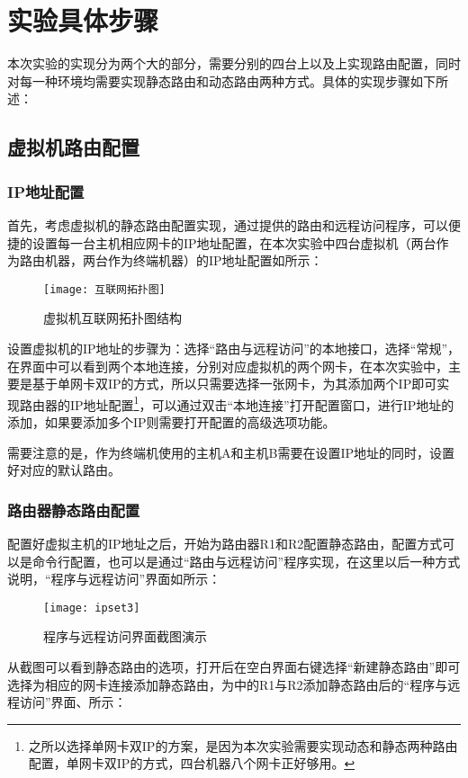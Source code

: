 \documentclass[lang=cn,11pt]{elegantpaper}
\begin{document}
\section{实验具体步骤}
本次实验的实现分为两个大的部分，需要分别的四台上以及上实现路由配置，同时对每一种环境均需要实现静态路由和动态路由两种方式。具体的实现步骤如下所述：
\subsection{虚拟机路由配置}
\subsubsection{IP地址配置}
首先，考虑虚拟机的静态路由配置实现，通过提供的路由和远程访问程序，可以便捷的设置每一台主机相应网卡的IP地址配置，在本次实验中四台虚拟机（两台作为路由机器，两台作为终端机器）的IP地址配置如所示：
\begin{figure}[htbp]
	\centering
	\texttt{[image: 互联网拓扑图]}
	\caption{虚拟机互联网拓扑图结构 \label{fig:tuopu}}
\end{figure}
设置虚拟机的IP地址的步骤为：选择“路由与远程访问”的本地接口，选择“常规”，在界面中可以看到两个本地连接，分别对应虚拟机的两个网卡，在本次实验中，主要是基于单网卡双IP的方式，所以只需要选择一张网卡，为其添加两个IP即可实现路由器的IP地址配置\footnote{之所以选择单网卡双IP的方案，是因为本次实验需要实现动态和静态两种路由配置，单网卡双IP的方式，四台机器八个网卡正好够用。}，可以通过双击“本地连接”打开配置窗口，进行IP地址的添加，如果要添加多个IP则需要打开配置的高级选项功能。

需要注意的是，作为终端机使用的主机A和主机B需要在设置IP地址的同时，设置好对应的默认路由。
\subsubsection{路由器静态路由配置}
配置好虚拟主机的IP地址之后，开始为路由器R1和R2配置静态路由，配置方式可以是命令行配置，也可以是通过“路由与远程访问”程序实现，在这里以后一种方式说明，“程序与远程访问”界面如所示：
\begin{figure}[htbp]
	\centering
	\texttt{[image: ipset3]}
	\caption{程序与远程访问界面截图演示\label{fig:jiemian}}
\end{figure}
从截图可以看到静态路由的选项，打开后在空白界面右键选择“新建静态路由”即可选择为相应的网卡连接添加静态路由，为中的R1与R2添加静态路由后的“程序与远程访问”界面、所示：
\end{document}
